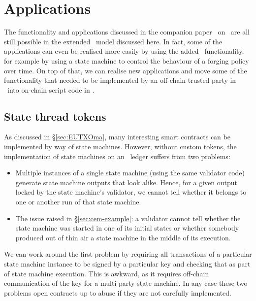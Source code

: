 \section{Applications}
\label{sec:applications}

The functionality and applications discussed in the companion paper~\cite{plain-multicurrency} on \UTXOma\ are all still possible in the extended \EUTXOma\ model discussed here. In fact, some of the applications can even be realised more easily by using the added \EUTXO\ functionality, for example by using a state machine to control the behaviour of a forging policy over time. On top of that, we can realise new applications and move some of the functionality that needed to be implemented by an off-chain trusted party in \UTXOma\ into on-chain script code in \EUTXOma.

\subsection{State thread tokens}

As discussed in \S\ref{sec:EUTXOma}, many interesting smart contracts can be implemented by way of state machines. However, without custom tokens, the implementation of state machines on an \EUTXO\ ledger suffers from two problems:
%
\begin{itemize}
\item Multiple instances of a single state machine (using the same validator code) generate state machine outputs that look alike. Hence, for a given output locked by the state machine's validator, we cannot tell whether it belongs to one or another run of that state machine.
\item The issue raised in \S\ref{sec:cem-example}: a validator cannot tell whether the state machine was started in one of its initial states or whether somebody produced out of thin air a state machine in the middle of its execution.
\end{itemize}
%
We can work around the first problem by requiring all transactions of a particular state machine instance to be signed by a particular key and checking that as part of state machine execution. This is awkward, as it requires off-chain communication of the key  for a multi-party state machine. In any case these two problems open contracts up to abuse if they are not carefully implemented.

